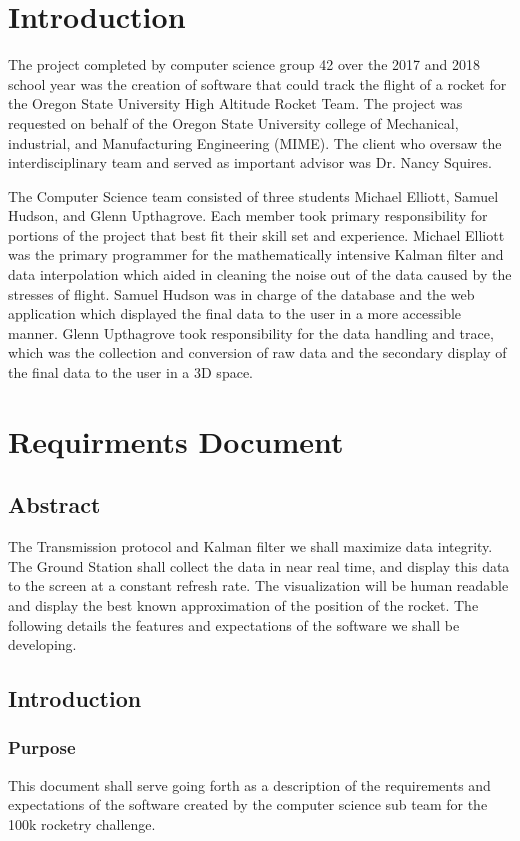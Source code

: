 \documentclass[onecolumn, draftclsnofoot,10pt, compsoc]{IEEEtran}
\begin{document}
\section {Introduction}
The project completed by computer science group 42 over the 2017 and 2018 school year was the creation of software that could track the flight of a rocket for the Oregon State University High Altitude Rocket Team. The project was requested on behalf of the Oregon State University college of Mechanical, industrial, and Manufacturing Engineering (MIME). The client who oversaw the interdisciplinary team and served as important advisor was Dr. Nancy Squires.\par
The Computer Science team consisted of three students Michael Elliott, Samuel Hudson, and Glenn Upthagrove. Each member took primary responsibility for portions of the project that best fit their skill set and experience. Michael Elliott was the primary programmer for the mathematically intensive Kalman filter and data interpolation which aided in cleaning the noise out of the data caused by the stresses of flight. Samuel Hudson was in charge of the database and the web application which displayed the final data to the user in a more accessible manner. Glenn Upthagrove took responsibility for the data handling and trace, which was the collection and conversion of raw data and the secondary display of the final data to the user in a 3D space.
\section {Requirments Document}
\subsection{Abstract}
The Transmission protocol and Kalman filter we shall maximize data integrity. The
Ground Station shall collect the data in near real time, and display this data to the screen at a
constant refresh rate. The visualization will be human readable and display the best known
approximation of the position of the rocket. The following details the features and
expectations of the software we shall be developing.\par
\subsection{Introduction}
\subsubsection{Purpose}
This document shall serve going forth as a description of the requirements and
expectations of the software created by the computer science sub team for the 100k rocketry
challenge.
\end{document}
